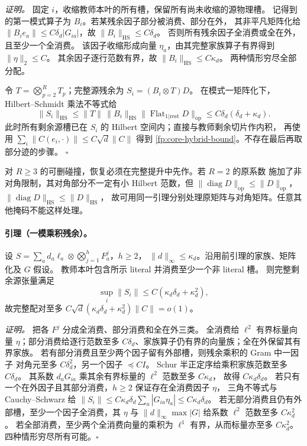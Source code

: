 \documentclass[a4paper]{tufte-handout}
\begin{document}
\begin{fullwidth}
\emph{证明。}
固定 $i$，收缩教师本叶的所有槽，保留所有尚未收缩的源物理槽。
记得到的第一模式算子为 $B_i$。若某残余因子部分被消费、部分在外，
其非平凡矩阵化给 $\|B_ie_a\|\leq C\delta_d|G_{ia}|$，故
$\|B_i\|_{\mathrm{HS}}\leq C\delta_d$。
否则所有残余因子全消费或全在外，且至少一个全消费。
该因子收缩形成向量 $\eta_a$，由其完整家族算子有界得到 $\|\eta\|_2\leq C$。
其余因子逐行范数有界，故
$\|B_i\|_{\mathrm{HS}}\leq C\kappa_d$。
两种情形穷尽全部分配。

令 $T=\bigotimes_{p=2}^RT_p$；完整源残余为 $S_i=(B_i\otimes T)D$。
在模式一矩阵化下，Hilbert--Schmidt 乘法不等式给
\[
 \|S_i\|_{\mathrm{HS}}
 \leq\|T\|\,\|B_i\|_{\mathrm{HS}}
       \|\operatorname{Flat}_{1|\mathrm{rest}}D\|_{\mathrm{op}}
 \leq C\delta_d(\delta_d+\kappa_d).
\]
此时所有剩余源槽已在 $S_i$ 的 Hilbert 空间内；直接与教师剩余切片作内积，
再使用 $\sum_i\|C(e_i,\cdot)\|\leq C\sqrt d\|C\|$ 得到
\eqref{fp:core-hybrid-bound}。不存在最后再取部分迹的步骤。
\hfill$\square$

对 $R\geq3$ 的可删碰撞，恢复必须在完整提升中先作。若 $R=2$ 的原系数
施加了非对角限制，其对角部分不一定有小 Hilbert 范数，但
$\|\operatorname{diag}D\|_{\mathrm{op}}\leq\|D\|_{\mathrm{op}}$，
$\|\operatorname{diag}D\|_{\mathrm{HS}}\leq\|D\|_{\mathrm{HS}}$，
故可用同一引理分别处理原矩阵与对角矩阵。任意其他掩码不能这样处理。

\paragraph{引理（一模乘积残余）。}
\label{fp:core-hybrid-R1}
设 $S=\sum_ad_a\ell_a\otimes\bigotimes_{j=1}^{h}F_a^j$，$h\geq2$，
$\|d\|_\infty\leq\kappa_d$。沿用前引理的家族、矩阵化及 $G$ 假设。
教师本叶包含所示 literal 并消费至少一个非 literal 槽。
则完整剩余源张量满足
\begin{equation}
 \sup_i\|S_i\|\leq C(\kappa_d\delta_d+\kappa_d^2),
 \label{fp:core-R1-bound}
\end{equation}
故完整配对至多 $C\sqrt d(\kappa_d\delta_d+\kappa_d^2)\|C\|=o(1)$。

\emph{证明。}
把各 $F^j$ 分成全消费、部分消费和全在外三类。
全消费给 $\ell^2$ 有界标量向量 $\eta$；部分消费给逐行范数至多
$C\delta_d$、家族算子仍有界的向量族；全在外保留其有界家族。
若有部分消费且至少两个因子留有外部槽，则残余乘积的 Gram 中一因子
对角元至多 $C\delta_d^2$，另一个因子 $\preceq CI$。
Schur 半正定序给乘积家族范数至多 $C\delta_d$。
其系数 $d_aG_{ia}$ 乘其余有界标量的 $\ell^2$ 范数至多 $C\kappa_d$，
故得 $C\kappa_d\delta_d$。
若只有一个在外因子且其部分消费，$h\geq2$ 保证存在全消费因子 $\eta$，
三角不等式与 Cauchy--Schwarz 给
$\|S_i\|\leq C\kappa_d\delta_d\sum_a|G_{ia}\eta_a|
\leq C\kappa_d\delta_d$。
若无部分消费且仍有外部槽，至少一个因子全消费，其 $\eta$ 与
$\|d\|_\infty\max|G|$ 给系数 $\ell^2$ 范数至多 $C\kappa_d^2$。
若全部消费，至少两个全消费向量的乘积为 $\ell^1$ 有界，从而标量亦至多
$C\kappa_d^2$。四种情形穷尽所有可能。\hfill$\square$


\end{fullwidth}
\end{document}
